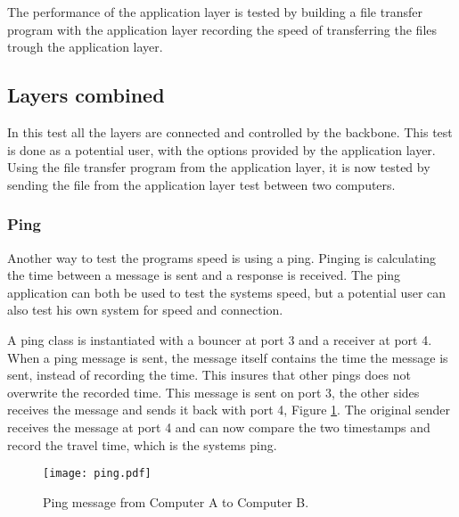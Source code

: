 The performance of the application layer is tested by building a file transfer program with the application layer recording the speed of transferring the files trough the application layer.

\subsection{Layers combined}

In this test all the layers are connected and controlled by the backbone. This test is done as a potential user, with the options provided by the application layer. Using the file transfer program from the application layer, it is now tested by sending the file from the application layer test between two computers. 
\subsubsection{Ping}
Another way to test the programs speed is using a ping. Pinging is calculating the time between a message is sent and a response is received. The ping application can both be used to test the systems speed, but a potential user can also test his own system for speed and connection.

A ping class is instantiated with a bouncer at port 3 and a receiver at port 4. When a ping message is sent, the message itself contains the time the message is sent, instead of recording the time. This insures that other pings does not overwrite the recorded time. This message is sent on port 3, the other sides receives the message and sends it back with port 4, Figure \ref{fig:ping}. The original sender receives the message at port 4 and can now compare the two timestamps and record the travel time, which is the systems ping.


\begin{figure}[htb]
	\begin{center}
	\texttt{[image: ping.pdf]}%
	\caption{Ping message from Computer A to Computer B.}
	\label{fig:ping}	
	\end{center}
\end{figure}


